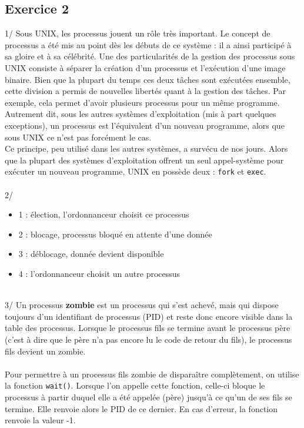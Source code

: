 \documentclass[a4paper,11pt]{article}
\begin{document}
	\subsection*{Exercice 2}
	1/ Sous UNIX, les processus jouent un rôle très important. Le concept de processus a été mis au point dès les débuts de ce système : il a ainsi participé à sa gloire et à sa célébrité. Une des particularités de la gestion des processus sous UNIX consiste à séparer la création d'un processus et l'exécution d'une image binaire. Bien que la plupart du temps ces deux tâches sont exécutées ensemble, cette division a permis de nouvelles libertés quant à la gestion des tâches. Par exemple, cela permet d'avoir plusieurs processus pour un même programme.\\
	Autrement dit, sous les autres systèmes d'exploitation (mis à part quelques exceptions), un processus est l'équivalent d'un nouveau programme, alors que sous UNIX ce n'est pas forcément le cas.\\
	Ce principe, peu utilisé dans les autres systèmes, a survécu de nos jours. Alors que la plupart des systèmes d'exploitation offrent un seul appel-système pour exécuter un nouveau programme, UNIX en possède deux : \lstinline!fork! et \lstinline!exec!.
	\\~\\
	2/ \begin{itemize}
				\item 1 : élection, l'ordonnanceur choisit ce processus
				\item 2 : blocage, processus bloqué en attente d'une donnée
				\item 3 : déblocage, donnée devient disponible
				\item 4 : l'ordonnanceur choisit un autre processus
			\end{itemize}
	~\\
	3/ Un processus \textbf{zombie} est un processus qui s'est achevé, mais qui dispose toujours d'un identifiant de processus (PID) et reste donc encore visible dans la table des processus. Lorsque le processus fils se termine avant le processus père (c'est à dire que le père n'a pas encore lu le code de retour du fils), le processus fils devient un zombie.
	\\~\\
	Pour permettre à un processus fils zombie de disparaître complètement, on utilise la fonction \lstinline!wait()!. Lorsque l'on appelle cette fonction, celle-ci bloque le processus à partir duquel elle a été appelée (père) jusqu'à ce qu'un de ses fils se termine. Elle renvoie alors le PID de ce dernier. En cas d'erreur, la fonction renvoie la valeur -1.\\
\end{document}
